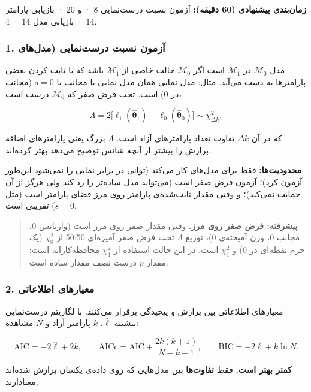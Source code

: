 \textbf{زمان‌بندی پیشنهادی (60 دقیقه):} آزمون نسبت درست‌نمایی 8 · 
و  20 · بازیابی پارامتر 14 · بازیابی مدل 14 ·
 4.

\subsubsection{\texorpdfstring{1. آزمون نسبت درست‌نمایی (مدل‌های
}{1. آزمون نسبت درست‌نمایی (مدل‌های nested)}}

مدل \(\mathcal{M}_0\) در \(\mathcal{M}_1\) \textbf{} است اگر
\(\mathcal{M}_0\) حالت خاصی از \(\mathcal{M}_1\) باشد که با ثابت کردن
بعضی پارامترها به دست می‌آید. مثال: مدل نمایی همان مدل نمایی با مجانب با
\(s = 0\) (مجانب در 0) است. تحت فرض صفر که \(\mathcal{M}_0\) درست است،

\[
\Lambda = 2\big[\ell_1(\hat{\boldsymbol\theta}_1) - \ell_0(\hat{\boldsymbol\theta}_0)\big] \;\dot\sim\; \chi^2_{\Delta k},
\]

که در آن \(\Delta k\) تفاوت تعداد پارامترهای آزاد است. \(\Lambda\) بزرگ
یعنی پارامترهای اضافه برازش را بیشتر از آنچه شانس توضیح می‌دهد بهتر
کرده‌اند.

\textbf{محدودیت‌ها:} فقط برای مدل‌های \textbf{} کار می‌کند
(توانی در برابر نمایی را نمی‌شود این‌طور آزمون کرد)؛ آزمون فرض صفر است
(می‌تواند مدل ساده‌تر را رد کند ولی هرگز از آن حمایت نمی‌کند)؛ و وقتی مقدار
ثابت‌شده‌ی پارامتر روی مرز فضای پارامتر است (مثل \(s = 0\)) تقریبی است.

\begin{quote}
\textbf{پیشرفته: فرض صفر روی مرز.} وقتی مقدار صفر روی مرز است (واریانس
0، مجانب 0، وزن آمیخته‌ی 0)، توزیع \(\Lambda\) تحت فرض صفر آمیزه‌ای 50:50
از \(\chi^2_0\) (یک جرم نقطه‌ای در 0) و \(\chi^2_1\) است. در این حالت
استفاده از \(\chi^2_1\) محافظه‌کارانه است: مقدار \(p\) درست نصف مقدار
ساده است.
\end{quote}

\subsubsection{2. معیارهای اطلاعاتی}

معیارهای اطلاعاتی بین برازش و پیچیدگی  برقرار می‌کنند. با
لگاریتم درست‌نمایی بیشینه \(\hat\ell\)، \(k\) پارامتر آزاد و \(N\)
مشاهده:

\[
\mathrm{AIC} = -2\hat\ell + 2k, \qquad
\mathrm{AICc} = \mathrm{AIC} + \frac{2k(k+1)}{N - k - 1}, \qquad
\mathrm{BIC} = -2\hat\ell + k \ln N.
\]

\textbf{کمتر بهتر است.} فقط \textbf{تفاوت‌ها} بین مدل‌هایی که روی داده‌ی
یکسان برازش شده‌اند معنادارند.


